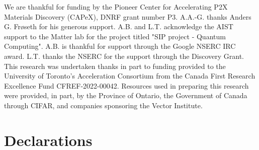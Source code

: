 \documentclass[pdflatex,sn-mathphys-num]{sn-jnl}%
\theoremstyle{thmstyleone}%
\theoremstyle{thmstyletwo}%
\theoremstyle{thmstylethree}%
\begin{document}
\backmatter


We are thankful for funding by the Pioneer Center for Accelerating P2X Materials Discovery (CAPeX), DNRF grant number P3.
A.A.-G. thanks Anders G. Frøseth for his generous support.
A.B. and L.T. acknowledge the AIST support to the Matter lab for the project titled "SIP project - Quantum Computing".
A.B. is thankful for support through the Google NSERC IRC award.
L.T. thanks the NSERC for the support through the Discovery Grant.
This research was undertaken thanks in part to funding provided to the University of Toronto’s Acceleration Consortium from the Canada First Research Excellence Fund CFREF-2022-00042.
Resources used in preparing this research were provided, in part, by the Province of Ontario, the Government of Canada through CIFAR, and companies sponsoring the Vector Institute.

\section*{Declarations}

\end{document}
